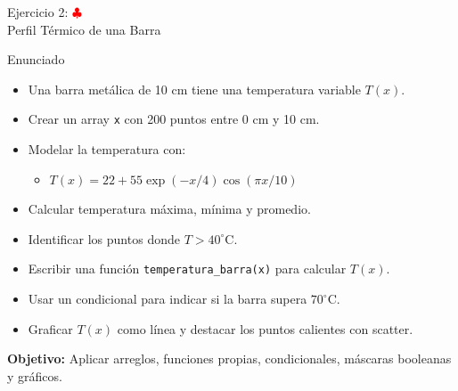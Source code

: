 \documentclass[10pt]{beamer}
\begin{document}
\begin{frame}[shrink=5]{Ejercicio 2: \hfill \textcolor{red}{$\clubsuit$} \\ Perfil Térmico de una Barra}
  \begin{block}{Enunciado}
    \begin{itemize}
      \item Una barra metálica de 10 cm tiene una temperatura variable \(T(x)\).
      \item Crear un array \texttt{x} con 200 puntos entre 0 cm y 10 cm.
      \item Modelar la temperatura con:
        \begin{itemize}
          \item \(T(x)=22+55\exp(-x/4)\cos(\pi x/10)\)
        \end{itemize}
      \item Calcular temperatura máxima, mínima y promedio.
      \item Identificar los puntos donde \(T>40^\circ\text{C}\).
      \item Escribir una función \texttt{temperatura\_barra(x)} para calcular \(T(x)\).
      \item Usar un condicional para indicar si la barra supera \(70^\circ\text{C}\).
      \item Graficar \(T(x)\) como línea y destacar los puntos calientes con scatter.
    \end{itemize}
  \end{block}
  \textbf{Objetivo:} Aplicar arreglos, funciones propias, condicionales, máscaras booleanas y gráficos.
\end{frame}
\end{document}

